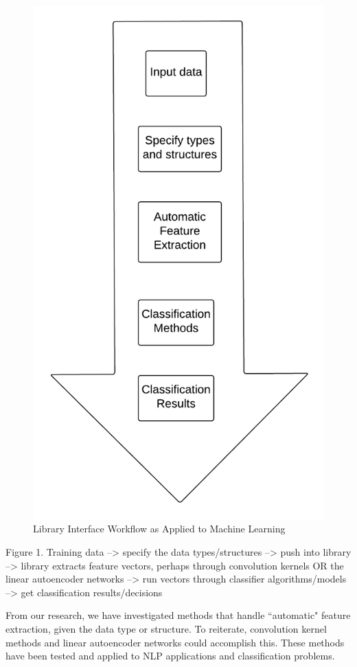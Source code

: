 \documentclass{sig-alternate}
\begin{document}

\begin{figure}[H]
	\begin{center}
		\includegraphics[width=0.75\linewidth]{ourworkflow}
	\end{center}
	\vspace{-12pt}
	\caption{Library Interface Workflow as Applied to Machine Learning}
	\label{fig:ourworkflow}
\end{figure}


Figure 1. 
Training data --> specify the data types/structures --> push into library --> library extracts feature vectors, perhaps through convolution kernels OR the linear autoencoder networks -->
run vectors through classifier algorithms/models --> get classification results/decisions


From our research, we have investigated methods that handle ``automatic" feature extraction, given
the data type or structure. To reiterate, convolution kernel methods and linear autoencoder networks 
could accomplish this. These methods have been tested and applied to NLP applications and 
classification problems.
\end{document}
